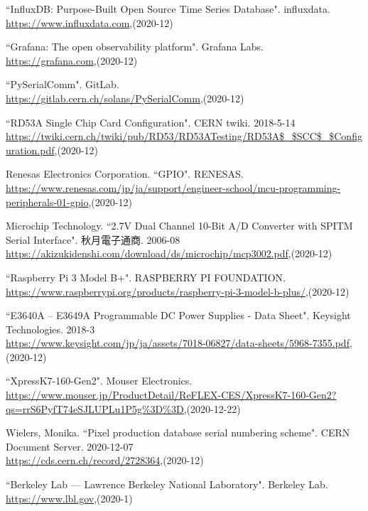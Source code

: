 \begin{thebibliography}{9}
``InfluxDB: Purpose-Built Open Source Time Series Database". influxdata. \\
\url{https://www.influxdata.com},(2020-12)

``Grafana: The open observability platform". Grafana Labs. \\
\url{https://grafana.com},(2020-12)

``PySerialComm". GitLab. \\
\url{https://gitlab.cern.ch/solans/PySerialComm},(2020-12)

``RD53A Single Chip Card Configuration". CERN twiki. 2018-5-14 \\
\url{https://twiki.cern.ch/twiki/pub/RD53/RD53ATesting/RD53A$\_$SCC$\_$Configuration.pdf},(2020-12)

Renesas Electronics Corporation. ``GPIO". RENESAS.  \\
\url{https://www.renesas.com/jp/ja/support/engineer-school/mcu-programming-peripherals-01-gpio},(2020-12)

Microchip Technology. ``2.7V Dual Channel 10-Bit A/D Converter with SPITM Serial Interface". 秋月電子通商. 2006-08\\
\url{https://akizukidenshi.com/download/ds/microchip/mcp3002.pdf},(2020-12)

``Raspberry Pi 3 Model B+". RASPBERRY PI FOUNDATION. \\
\url{https://www.raspberrypi.org/products/raspberry-pi-3-model-b-plus/},(2020-12)

``E3640A – E3649A Programmable DC Power Supplies - Data Sheet". Keysight Technologies. 2018-3\\
\url{https://www.keysight.com/jp/ja/assets/7018-06827/data-sheets/5968-7355.pdf},(2020-12)

``XpressK7-160-Gen2". Mouser Electronics.\\
\url{https://www.mouser.jp/ProductDetail/ReFLEX-CES/XpressK7-160-Gen2?qs=rrS6PyfT74eSJLUPLu1P5g\%3D\%3D},(2020-12-22)

Wielers, Monika. ``Pixel production database serial numbering scheme". CERN Document Server. 2020-12-07\\
\url{https://cds.cern.ch/record/2728364},(2020-12)

``Berkeley Lab — Lawrence Berkeley National Laboratory". Berkeley Lab. \\
\url{https://www.lbl.gov},(2020-1)


\end{thebibliography}
